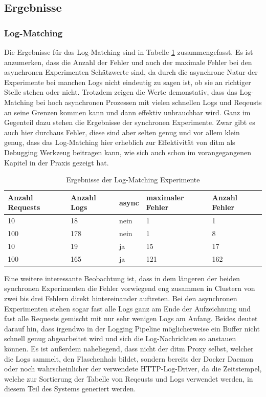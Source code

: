 \documentclass[12pt,a4paper]{report}
\begin{document}
\subsection{Ergebnisse}
\subsubsection{Log-Matching}
Die Ergebnisse für das Log-Matching sind in Tabelle \ref{tab:logs} zusammengefasst.
Es ist anzumerken, dass die Anzahl der Fehler und auch der maximale Fehler bei den asynchronen Experimenten Schätzwerte sind, da durch
die asynchrone Natur der Experimente bei manchen Logs nicht eindeutig zu sagen ist, ob sie an richtiger Stelle stehen oder nicht.
Trotzdem zeigen die Werte demonstativ, dass das Log-Matching bei hoch asynchronen Prozessen mit vielen schnellen Logs
und Reqeusts an seine Grenzen kommen kann und dann effektiv unbrauchbar wird. Ganz im Gegenteil dazu stehen die Ergebnisse der
synchronen Experimente. Zwar gibt es auch hier durchaus Fehler, diese sind aber selten genug und vor allem klein genug, dass das Log-Matching
hier erheblich zur Effektivität von ditm als Debugging Werkzeug beitragen kann, wie sich auch schon im vorangegangenen Kapitel in
der Praxis gezeigt hat.
\begin{table}[H]
	\centering
	\caption{Ergebnisse der Log-Matching Experimente}
	\label{tab:logs}
	\begin{tabular}{|l|l|l|l|l|}
		\hline
		Anzahl Requests & Anzahl Logs & async & maximaler Fehler & Anzahl Fehler \\ \hline
		10              & 18          & nein  & 1                & 1             \\ \hline
		100             & 178         & nein  & 1                & 8             \\ \hline
		10              & 19          & ja    & 15               & 17            \\ \hline
		100             & 165         & ja    & 121              & 162           \\ \hline
	\end{tabular}
\end{table}

Eine weitere interessante Beobachtung ist, dass in dem längeren der beiden synchronen Experimenten die Fehler vorwiegend eng zusammen in Clustern
von zwei bis drei Fehlern direkt hintereinander auftreten. Bei den asynchronen Experimenten stehen sogar fast alle Logs ganz am Ende der Aufzeichnung
und fast alle Requests gemischt mit nur sehr wenigen Logs am Anfang. Beides deutet darauf hin, dass irgendwo in der Logging Pipeline möglicherweise
ein Buffer nicht schnell genug abgearbeitet wird und sich die Log-Nachrichten so anstauen können. Es ist außerdem naheliegend, dass nicht der ditm Proxy
selbst, welcher die Logs sammelt, den Flaschenhals bildet, sondern bereits der Docker Daemon oder noch wahrscheinlicher der verwendete HTTP-Log-Driver,
da die Zeitstempel, welche zur Sortierung der Tabelle von Reqeusts und Logs verwendet werden, in diesem Teil des Systems generiert werden.
\end{document}
